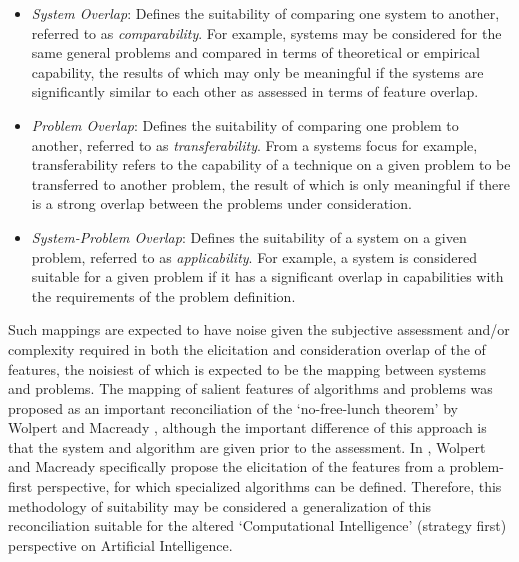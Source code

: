 \begin{itemize}
	\item \emph{System Overlap}: Defines the suitability of comparing one system to another, referred to as \emph{comparability}. For example, systems may be considered for the same general problems and compared in terms of theoretical or empirical capability, the results of which may only be meaningful if the systems are significantly similar to each other as assessed in terms of feature overlap. 
	\item \emph{Problem Overlap}: Defines the suitability of comparing one problem to another, referred to as \emph{transferability}. From a systems focus for example, transferability refers to the capability of a technique on a given problem to be transferred to another problem, the result of which is only meaningful if there is a strong overlap between the problems under consideration.
	\item \emph{System-Problem Overlap}: Defines the suitability of a system on a given problem, referred to as \emph{applicability}. For example, a system is considered suitable for a given problem if it has a significant overlap in capabilities with the requirements of the problem definition.
\end{itemize}

Such mappings are expected to have noise given the subjective assessment and/or complexity required in both the elicitation and consideration overlap of the of features, the noisiest of which is expected to be the mapping between systems and problems. 
The mapping of salient features of algorithms and problems was proposed as an important reconciliation of the `no-free-lunch theorem' by Wolpert and Macready \cite{Wolpert1997}, although the important difference of this approach is that the system and algorithm are given prior to the assessment. In \cite{Wolpert1995}, Wolpert and Macready specifically propose the elicitation of the features from a problem-first perspective, for which specialized algorithms can be defined. Therefore, this methodology of suitability may be considered a generalization of this reconciliation suitable for the altered `Computational Intelligence' (strategy first) perspective on Artificial Intelligence.

%
%
